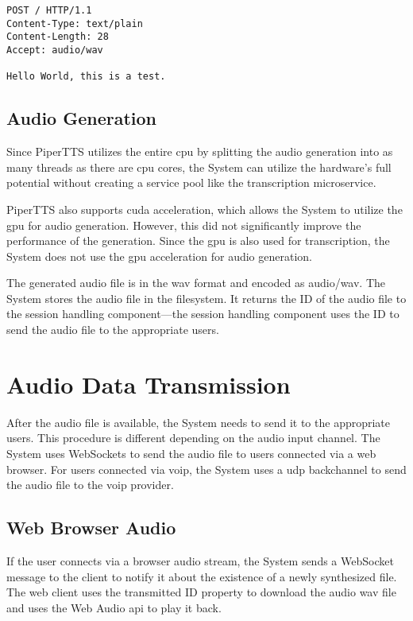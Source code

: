 \begin{verbatim}
POST / HTTP/1.1
Content-Type: text/plain
Content-Length: 28
Accept: audio/wav

Hello World, this is a test.

\end{verbatim}

\subsection{Audio Generation}

Since PiperTTS utilizes the entire \ac{cpu} by splitting the audio generation into as many threads as there are 
\ac{cpu} cores, the System can utilize the hardware's full potential without creating a service pool like the 
transcription microservice.

PiperTTS also supports \ac{cuda} acceleration, which allows the System to utilize the \ac{gpu} for audio generation. 
However, this did not significantly improve the performance of the generation. Since the \ac{gpu} is also used for 
transcription, the System does not use the \ac{gpu} acceleration for audio generation.

The generated audio file is in the \ac{wav} format and encoded as audio/wav. The System stores the audio file in the 
filesystem. It returns the ID of the audio file to the session handling component—the session handling component uses 
the ID to send the audio file to the appropriate users. 


\section{Audio Data Transmission}

After the audio file is available, the System needs to send it to the appropriate users. This procedure is different 
depending on the audio input channel. The System uses WebSockets to send the audio file to users connected via a web 
browser. For users connected via \ac{voip}, the System uses a \ac{udp} backchannel to send the audio file to the 
\ac{voip} provider.

\subsection{Web Browser Audio}

If the user connects via a browser audio stream, the System sends a WebSocket message to the client to notify it about 
the existence of a newly synthesized file. The web client uses the transmitted ID property to download the audio 
\ac{wav} file and uses the Web Audio \ac{api} to play it back.

